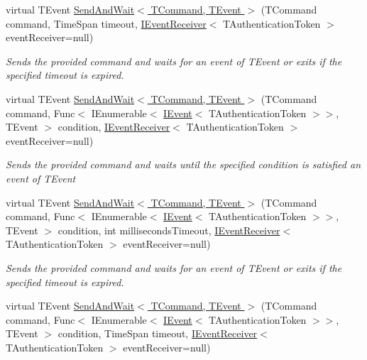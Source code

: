 \begin{DoxyCompactItemize}
virtual T\+Event \hyperlink{classCqrs_1_1Bus_1_1InProcessBus_a6d49efcd657ed029f97fac292e6296b0}{Send\+And\+Wait$<$ T\+Command, T\+Event $>$} (T\+Command command, Time\+Span timeout, \hyperlink{interfaceCqrs_1_1Events_1_1IEventReceiver}{I\+Event\+Receiver}$<$ T\+Authentication\+Token $>$ event\+Receiver=null)
\begin{DoxyCompactList}\small\item\em Sends the provided {\itshape command}  and waits for an event of {\itshape T\+Event}  or exits if the specified timeout is expired. \end{DoxyCompactList}\item 
virtual T\+Event \hyperlink{classCqrs_1_1Bus_1_1InProcessBus_ac8c4a77edc761f15e16c638624424443}{Send\+And\+Wait$<$ T\+Command, T\+Event $>$} (T\+Command command, Func$<$ I\+Enumerable$<$ \hyperlink{interfaceCqrs_1_1Events_1_1IEvent}{I\+Event}$<$ T\+Authentication\+Token $>$$>$, T\+Event $>$ condition, \hyperlink{interfaceCqrs_1_1Events_1_1IEventReceiver}{I\+Event\+Receiver}$<$ T\+Authentication\+Token $>$ event\+Receiver=null)
\begin{DoxyCompactList}\small\item\em Sends the provided {\itshape command}  and waits until the specified condition is satisfied an event of {\itshape T\+Event}  \end{DoxyCompactList}\item 
virtual T\+Event \hyperlink{classCqrs_1_1Bus_1_1InProcessBus_af3ed033471e85b2943a470c1a635f9c4}{Send\+And\+Wait$<$ T\+Command, T\+Event $>$} (T\+Command command, Func$<$ I\+Enumerable$<$ \hyperlink{interfaceCqrs_1_1Events_1_1IEvent}{I\+Event}$<$ T\+Authentication\+Token $>$$>$, T\+Event $>$ condition, int milliseconds\+Timeout, \hyperlink{interfaceCqrs_1_1Events_1_1IEventReceiver}{I\+Event\+Receiver}$<$ T\+Authentication\+Token $>$ event\+Receiver=null)
\begin{DoxyCompactList}\small\item\em Sends the provided {\itshape command}  and waits for an event of {\itshape T\+Event}  or exits if the specified timeout is expired. \end{DoxyCompactList}\item 
virtual T\+Event \hyperlink{classCqrs_1_1Bus_1_1InProcessBus_aae598cbe7ec6f4238e5a5b966df1157c}{Send\+And\+Wait$<$ T\+Command, T\+Event $>$} (T\+Command command, Func$<$ I\+Enumerable$<$ \hyperlink{interfaceCqrs_1_1Events_1_1IEvent}{I\+Event}$<$ T\+Authentication\+Token $>$$>$, T\+Event $>$ condition, Time\+Span timeout, \hyperlink{interfaceCqrs_1_1Events_1_1IEventReceiver}{I\+Event\+Receiver}$<$ T\+Authentication\+Token $>$ event\+Receiver=null)
$$
\end{DoxyCompactItemize}
